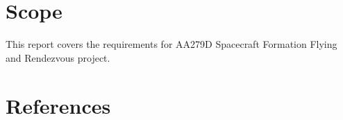 \documentclass[11pt,letterpaper]{article}
\begin{document}
\newpage
\tableofcontents

\newpage
\listoffigures

\newpage
\listoftables

\newpage
\section{Scope}
This report covers the requirements for AA279D Spacecraft Formation Flying and Rendezvous project.


\newpage

\newpage

\newpage

\newpage

\newpage

\newpage

\newpage

\newpage


\newpage
\section{References}
\printbibliography[heading=none]

\newpage

\end{document}
